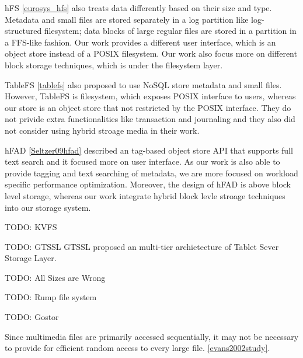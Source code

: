hFS \ref{eurosys_hfs} also treats data differently based on their size and
type. Metadata and small files are stored separately in a log partition like
log-structured filesystem; data blocks of large regular files are stored in a
partition in a FFS-like fashion. Our work provides a different user interface,
which is an object store instead of a POSIX filesystem. Our work also focus
more on different block storage techniques, which is under the filesystem
layer.

TableFS \ref{tablefs} also proposed to use NoSQL store metadata and small
files. However, TableFS is filesystem, which exposes POSIX interface to users,
whereas our store is an object store that not restricted by the POSIX
interface.  They do not privide extra functionalities like transaction and
journaling and they also did not consider using hybrid stroage media in their
work.

hFAD \ref{Seltzer09hfad} described an tag-based object store API that supports
full text search and it focused more on user interface. As our work is also
able to provide tagging and text searching of metadata, we are more focused on
workload specific performance optimization. Moreover, the design of hFAD is
above block level storage, whereas our work integrate hybrid block levle
stroage techniques into our storage system.

TODO: KVFS

TODO: GTSSL
GTSSL proposed an multi-tier archietecture of Tablet Sever Storage Layer.

TODO: All Sizes are Wrong

TODO: Rump file system

TODO: Gostor

Since multimedia files are primarily accessed sequentially, it may not be
necessary to provide for efficient random access to every large file.
\ref{evans2002study}.
